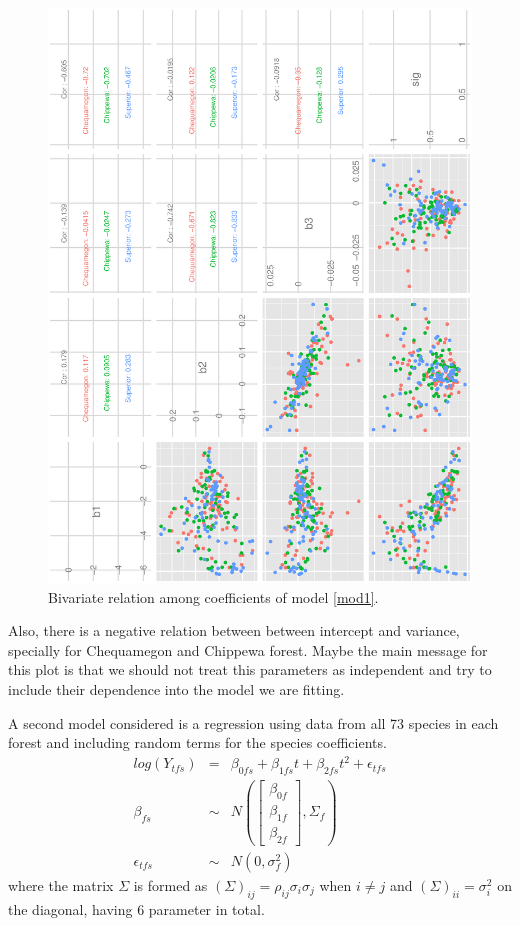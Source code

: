 \documentclass{article}
\begin{document}
\begin{figure}[h!]
\centering
\includegraphics[scale=.6, angle=-90]{scat_m1.ps}
\caption{Bivariate relation among coefficients of model \ref{mod1}. \label{pairs1}}
\end{figure}
Also, there is a negative relation between between intercept and variance, specially for Chequamegon and Chippewa forest. Maybe the main message for this plot is that we should not treat this parameters as independent and try to include their dependence into the model we are fitting. 


A second model considered is a regression using data from all 73 species in each forest and including random terms for the species coefficients. 
\begin{eqnarray}
\nonumber log(Y_{tfs}) &=&  \beta_{0fs} + \beta_{1fs}t + \beta_{2fs}t^2 + \epsilon_{tfs}  \\
\beta_{fs} &\sim& N \left( \left[ \begin{array}{c}
    \beta_{0f}   \\ 
    \beta_{1f}  \\ 
    \beta_{2f}  
\end{array} \right],   \Sigma_f \right) \\ 
\epsilon_{tfs} &\sim& N(0,\sigma_f^2)
\label{mod2}
\end{eqnarray}
where the matrix $\Sigma$ is formed as $(\Sigma)_{ij}=\rho_{ij}\sigma_i\sigma_j$ when $i\neq j$ and $(\Sigma)_{ii}=\sigma_i^2$ on the diagonal, having 6 parameter in total.     
\end{document}

